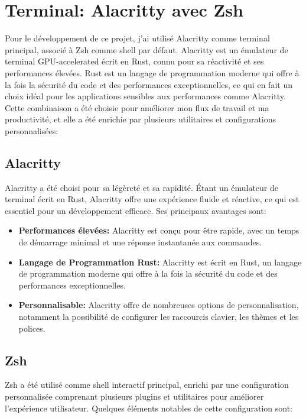 \section{Terminal: Alacritty avec Zsh}

\hspace{16pt}Pour le développement de ce projet, j'ai utilisé Alacritty comme terminal principal, associé à Zsh comme shell par défaut. Alacritty est un émulateur de terminal GPU-accelerated écrit en Rust, connu pour sa réactivité et ses performances élevées. Rust est un langage de programmation moderne qui offre à la fois la sécurité du code et des performances exceptionnelles, ce qui en fait un choix idéal pour les applications sensibles aux performances comme Alacritty. Cette combinaison a été choisie pour améliorer mon flux de travail et ma productivité, et elle a été enrichie par plusieurs utilitaires et configurations personnalisées:

\subsection{Alacritty}

\hspace{16pt}Alacritty a été choisi pour sa légèreté et sa rapidité. Étant un émulateur de terminal écrit en Rust, Alacritty offre une expérience fluide et réactive, ce qui est essentiel pour un développement efficace. Ses principaux avantages sont:

\begin{itemize}
  \item \textbf{Performances élevées: }Alacritty est conçu pour être rapide, avec un temps de démarrage minimal et une réponse instantanée aux commandes.
  \item \textbf{Langage de Programmation Rust: }Alacritty est écrit en Rust, un langage de programmation moderne qui offre à la fois la sécurité du code et des performances exceptionnelles.
  \item \textbf{Personnalisable: }Alacritty offre de nombreuses options de personnalisation, notamment la possibilité de configurer les raccourcis clavier, les thèmes et les polices.
\end{itemize}

\subsection{Zsh}

\hspace{16pt}Zsh a été utilisé comme shell interactif principal, enrichi par une configuration personnalisée comprenant plusieurs plugins et utilitaires pour améliorer l'expérience utilisateur. Quelques éléments notables de cette configuration sont:


